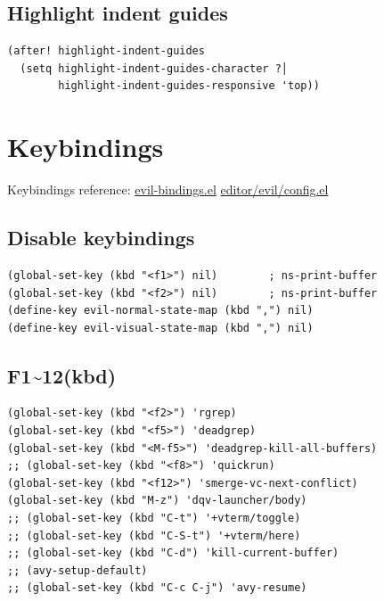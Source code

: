 \documentclass[11pt]{article}
\begin{document}
\subsection{Highlight indent guides}
\label{sec:org92adc08}

\begin{verbatim}
(after! highlight-indent-guides
  (setq highlight-indent-guides-character ?│
        highlight-indent-guides-responsive 'top))
\end{verbatim}

\section{Keybindings}
\label{sec:orgdd747ab}
Keybindings reference:
\href{https://github.com/hlissner/doom-emacs/blob/develop/modules/config/default/\%2Bevil-bindings.el}{evil-bindings.el}
\href{https://github.com/hlissner/doom-emacs/blob/617fc7f1cc6c91d80a30aca0445ae21f1bd5ddc9/modules/editor/evil/config.el}{editor/evil/config.el}

\subsection{Disable keybindings}
\label{sec:org7d1a70b}
\begin{verbatim}
(global-set-key (kbd "<f1>") nil)        ; ns-print-buffer
(global-set-key (kbd "<f2>") nil)        ; ns-print-buffer
(define-key evil-normal-state-map (kbd ",") nil)
(define-key evil-visual-state-map (kbd ",") nil)
\end{verbatim}

\subsection{F1\textasciitilde{}12(kbd)}
\label{sec:org49a7f80}

\begin{verbatim}
(global-set-key (kbd "<f2>") 'rgrep)
(global-set-key (kbd "<f5>") 'deadgrep)
(global-set-key (kbd "<M-f5>") 'deadgrep-kill-all-buffers)
;; (global-set-key (kbd "<f8>") 'quickrun)
(global-set-key (kbd "<f12>") 'smerge-vc-next-conflict)
(global-set-key (kbd "M-z") 'dqv-launcher/body)
;; (global-set-key (kbd "C-t") '+vterm/toggle)
;; (global-set-key (kbd "C-S-t") '+vterm/here)
;; (global-set-key (kbd "C-d") 'kill-current-buffer)
;; (avy-setup-default)
;; (global-set-key (kbd "C-c C-j") 'avy-resume)
\end{verbatim}
\end{document}
